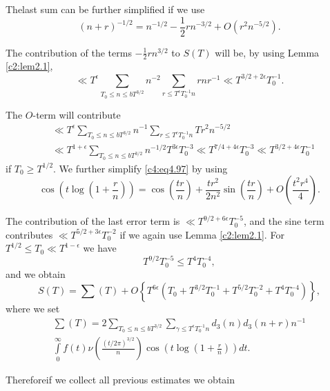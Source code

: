 The\pageoriginale last sum can be further simplified if we use
$$
(n+r)^{-1/2} = n^{-1/2} - \frac{1}{2} rn^{-3/2} +  O \left(r^2 n^{-5/2}\right).
$$

The contribution of the terms $-\frac{1}{2} r n^{3/2}$ to $S(T)$ will
be, by using Lemma \ref{c2:lem2.1},
$$
\ll T^\epsilon \sum_{T_0 \leq n \leq bT^{3/2}}n^{-2} \sum_{r \leq
  T^\epsilon T_0^{-1} n} r nr^{-1} \ll T^{3/2 + 2 \epsilon} T_0^{-1}.
$$

The $O$-term will contribute
\begin{align*}
  & \ll T^\epsilon \sum_{T_0 \leq n \leq bT^{3/2}} n^{-1} \sum_{r \leq
      T^\epsilon T_0^{-1} n} Tr^2 n^{-5/2}\\[5pt]
  & \ll T^{1+\epsilon} \sum_{T_0 \leq n \leq bT^{3/2}} n^{-1/2} T^{3
    \epsilon} T_0^{-3} \ll T^{7/4 + 4 \epsilon} T^{-3}_0  \ll T^{3/2 + 4 \epsilon} T_0^{-1}
\end{align*}
if $T_0 \geq T^{1/2}$. We further simplify \eqref{c4:eq4.97} by using 
$$
\cos \left( t \log \left(1+ \frac{r}{n} \right)\right) = \cos
\left(\frac{tr}{n} \right) + \frac{tr^2}{2n^2} \sin \left(\frac{tr}{n}
\right) + O \left(\frac{t^2 r^4}{4} \right).
$$

The contribution of the last error term is $\ll T^{9/2+ 6\epsilon}
T_0^{-5}$, and the sine term contributes $\ll T^{5/2 + 3
  \epsilon}T_0^{-2}$ if we again use Lemma \ref{c2:lem2.1}. For
$T^{1/2} \leq T_0 \ll T^{1- \epsilon}$ we have
$$
T^{9/2}T_0^{-5} \leq T^4 T_0^{-4},
$$
and we obtain 
$$
S(T) = \sum (T) + O \left\{T^{6\epsilon}\left(T_0 + T^{3/2}T_0^{-1} +
T^{5/2}T_0^{-2} + T^4 T_0^{-4}\right) \right\},
$$
where we set
\begin{multline*}
  \sum(T) =2 \sum_{T_0 \leq n \leq b T^{3/2}} \sum_{\gamma \leq
    T^\epsilon T_0^{-1}n} d_3 (n) d_3 (n+r)n^{-1}\\
  \int\limits_0^\infty f(t)\nu \left(\frac{(t/2\pi)^{3/2}}{n} \right)
  \cos \left(t \log \left(1+ \frac{r}{n} \right) \right) dt.
\end{multline*}

Therefore\pageoriginale if we collect all previous estimates we obtain


